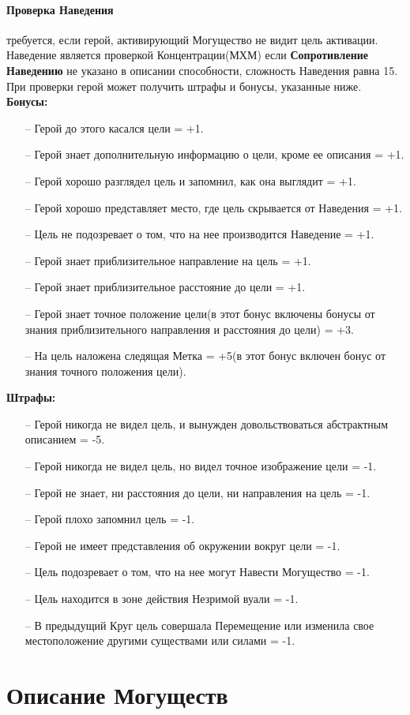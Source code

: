 \paragraph{Проверка Наведения} требуется, если герой, активирующий Могущество не видит цель активации. Наведение является проверкой Концентрации(МХМ) если \textbf{Сопротивление Наведению} не указано в описании способности, сложность Наведения равна 15. При проверки герой может получить штрафы и бонусы, указанные ниже.
\newline
\textbf{Бонусы:}
\begin{itemize}
\item[--]Герой до этого касался цели = +1.
\item[--]Герой знает дополнительную информацию о цели, кроме ее описания = +1.
\item[--]Герой хорошо разглядел цель и запомнил, как она выглядит = +1.
\item[--]Герой хорошо представляет место, где цель скрывается от Наведения = +1.
\item[--]Цель не подозревает о том, что на нее производится Наведение = +1.
\item[--]Герой знает приблизительное направление на цель = +1.
\item[--]Герой знает приблизительное расстояние до цели = +1.
\item[--]Герой знает точное положение цели(в этот бонус включены бонусы от знания приблизительного направления и расстояния до цели) = +3.
\item[--]На цель наложена следящая Метка = +5(в этот бонус включен бонус от знания точного положения цели).

\end{itemize}
\textbf{Штрафы:}
\begin{itemize}
\item[--]Герой никогда не видел цель, и вынужден довольствоваться абстрактным описанием = -5.
\item[--]Герой никогда не видел цель, но видел точное изображение цели = -1.
\item[--]Герой не знает, ни расстояния до цели, ни направления на цель = -1.
\item[--]Герой плохо запомнил цель = -1.
\item[--]Герой не имеет представления об окружении вокруг цели = -1.
\item[--]Цель подозревает о том, что на нее могут Навести Могущество = -1.
\item[--]Цель находится в зоне действия Незримой вуали = -1.
\item[--]В предыдущий Круг цель совершала Перемещение или изменила свое местоположение другими существами или силами = -1.
\end{itemize}

\section{Описание Могуществ}
